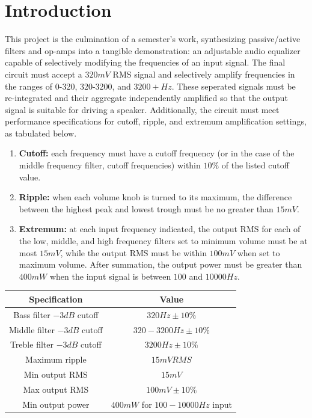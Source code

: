 \documentclass[notitlepage, 12pt]{report}
\begin{document}
\section*{Introduction}
This project is the culmination of a semester's work, synthesizing 
passive/active filters and op-amps into a tangible demonstration: an adjustable 
audio equalizer capable of selectively modifying the frequencies 
of an input signal. The final circuit must accept a $320 mV$ RMS signal and selectively amplify 
frequencies in the ranges of 0-320, 320-3200, and $3200+ Hz$. These seperated
signals must be re-integrated and their aggregate independently amplified so that 
the output signal is suitable for driving a speaker. 
Additionally, the circuit must meet performance specifications for cutoff, 
ripple, and extremum amplification settings, as tabulated below. 
\begin{enumerate}
    \item \textbf{Cutoff:} each frequency must have a cutoff frequency
    (or in the case of the middle frequency filter, cutoff frequencies)
    within $10\%$ of the listed cutoff value. 
    \item \textbf{Ripple:} when each volume knob is turned to its maximum, 
    the difference between the highest peak and lowest trough 
    must be no greater than $15mV$. 
    \item \textbf{Extremum:} at each input frequency 
    indicated, the output RMS for each of the low, middle, and high 
    frequency filters set to minimum volume must be at most $15 mV$, 
    while the output RMS must be within $100 mV$ when set to maximum volume. 
    After summation, the output power must be greater than $400 mW$ when the 
    input signal is between $100$ and $10000 Hz$. 
\end{enumerate}
\begin{center}
    \begin{tabular}{c c} 
        \toprule
        Specification & Value \\
        \hline  
        Bass filter $-3dB$ cutoff & $320 Hz \pm 10\%$ \\
        Middle filter $-3dB$ cutoff & $320-3200 Hz \pm 10\%$ \\
        Treble filter $-3dB$ cutoff & $3200 Hz \pm 10\%$ \\
        \hline
        Maximum ripple & $15 mV RMS$ \\
        \hline
        Min output RMS & $15 mV$ \\
        Max output RMS & $100 mV \pm 10\%$ \\
        Min output power & $400 mW$ for $100-10000 Hz$ input \\
        \bottomrule  
    \end{tabular}
\end{center}
\end{document}
